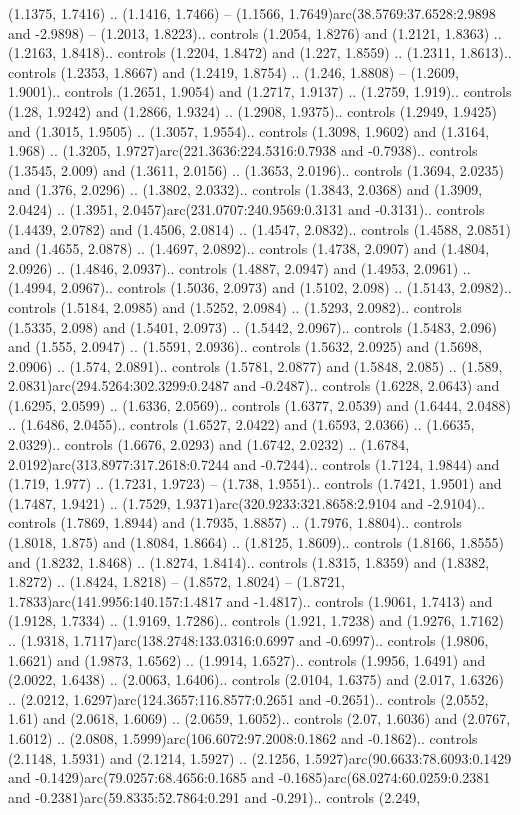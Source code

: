 (1.1375, 1.7416) .. (1.1416, 1.7466) -- (1.1566, 1.7649)arc(38.5769:37.6528:2.9898 and -2.9898) -- (1.2013, 1.8223).. controls (1.2054, 1.8276) and (1.2121, 1.8363) .. (1.2163, 1.8418).. controls (1.2204, 1.8472) and (1.227, 1.8559) .. (1.2311, 1.8613).. controls (1.2353, 1.8667) and (1.2419, 1.8754) .. (1.246, 1.8808) -- (1.2609, 1.9001).. controls (1.2651, 1.9054) and (1.2717, 1.9137) .. (1.2759, 1.919).. controls (1.28, 1.9242) and (1.2866, 1.9324) .. (1.2908, 1.9375).. controls (1.2949, 1.9425) and (1.3015, 1.9505) .. (1.3057, 1.9554).. controls (1.3098, 1.9602) and (1.3164, 1.968) .. (1.3205, 1.9727)arc(221.3636:224.5316:0.7938 and -0.7938).. controls (1.3545, 2.009) and (1.3611, 2.0156) .. (1.3653, 2.0196).. controls (1.3694, 2.0235) and (1.376, 2.0296) .. (1.3802, 2.0332).. controls (1.3843, 2.0368) and (1.3909, 2.0424) .. (1.3951, 2.0457)arc(231.0707:240.9569:0.3131 and -0.3131).. controls (1.4439, 2.0782) and (1.4506, 2.0814) .. (1.4547, 2.0832).. controls (1.4588, 2.0851) and (1.4655, 2.0878) .. (1.4697, 2.0892).. controls (1.4738, 2.0907) and (1.4804, 2.0926) .. (1.4846, 2.0937).. controls (1.4887, 2.0947) and (1.4953, 2.0961) .. (1.4994, 2.0967).. controls (1.5036, 2.0973) and (1.5102, 2.098) .. (1.5143, 2.0982).. controls (1.5184, 2.0985) and (1.5252, 2.0984) .. (1.5293, 2.0982).. controls (1.5335, 2.098) and (1.5401, 2.0973) .. (1.5442, 2.0967).. controls (1.5483, 2.096) and (1.555, 2.0947) .. (1.5591, 2.0936).. controls (1.5632, 2.0925) and (1.5698, 2.0906) .. (1.574, 2.0891).. controls (1.5781, 2.0877) and (1.5848, 2.085) .. (1.589, 2.0831)arc(294.5264:302.3299:0.2487 and -0.2487).. controls (1.6228, 2.0643) and (1.6295, 2.0599) .. (1.6336, 2.0569).. controls (1.6377, 2.0539) and (1.6444, 2.0488) .. (1.6486, 2.0455).. controls (1.6527, 2.0422) and (1.6593, 2.0366) .. (1.6635, 2.0329).. controls (1.6676, 2.0293) and (1.6742, 2.0232) .. (1.6784, 2.0192)arc(313.8977:317.2618:0.7244 and -0.7244).. controls (1.7124, 1.9844) and (1.719, 1.977) .. (1.7231, 1.9723) -- (1.738, 1.9551).. controls (1.7421, 1.9501) and (1.7487, 1.9421) .. (1.7529, 1.9371)arc(320.9233:321.8658:2.9104 and -2.9104).. controls (1.7869, 1.8944) and (1.7935, 1.8857) .. (1.7976, 1.8804).. controls (1.8018, 1.875) and (1.8084, 1.8664) .. (1.8125, 1.8609).. controls (1.8166, 1.8555) and (1.8232, 1.8468) .. (1.8274, 1.8414).. controls (1.8315, 1.8359) and (1.8382, 1.8272) .. (1.8424, 1.8218) -- (1.8572, 1.8024) -- (1.8721, 1.7833)arc(141.9956:140.157:1.4817 and -1.4817).. controls (1.9061, 1.7413) and (1.9128, 1.7334) .. (1.9169, 1.7286).. controls (1.921, 1.7238) and (1.9276, 1.7162) .. (1.9318, 1.7117)arc(138.2748:133.0316:0.6997 and -0.6997).. controls (1.9806, 1.6621) and (1.9873, 1.6562) .. (1.9914, 1.6527).. controls (1.9956, 1.6491) and (2.0022, 1.6438) .. (2.0063, 1.6406).. controls (2.0104, 1.6375) and (2.017, 1.6326) .. (2.0212, 1.6297)arc(124.3657:116.8577:0.2651 and -0.2651).. controls (2.0552, 1.61) and (2.0618, 1.6069) .. (2.0659, 1.6052).. controls (2.07, 1.6036) and (2.0767, 1.6012) .. (2.0808, 1.5999)arc(106.6072:97.2008:0.1862 and -0.1862).. controls (2.1148, 1.5931) and (2.1214, 1.5927) .. (2.1256, 1.5927)arc(90.6633:78.6093:0.1429 and -0.1429)arc(79.0257:68.4656:0.1685 and -0.1685)arc(68.0274:60.0259:0.2381 and -0.2381)arc(59.8335:52.7864:0.291 and -0.291).. controls (2.249, 